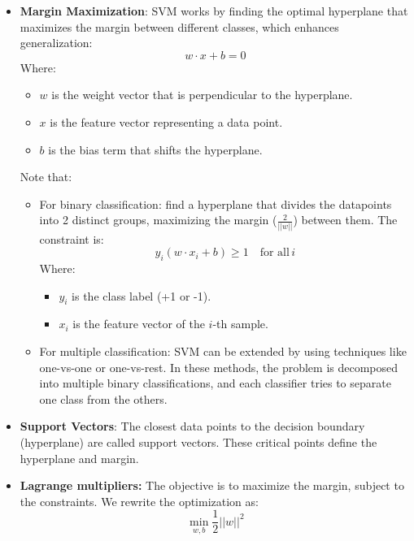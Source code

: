 \begin{itemize}
    \item \textbf{Margin Maximization}: SVM works by finding the optimal hyperplane that maximizes the margin between different classes, which enhances generalization:
    \begin{equation}
        \label{eq:equation8}
        w \cdot x + b = 0
    \end{equation}
    Where:
    \begin{itemize}
        \item $w$ is the weight vector that is perpendicular to the hyperplane.
        \item $x$ is the feature vector representing a data point.
        \item $b$ is the bias term that shifts the hyperplane.
    \end{itemize}

    Note that:
    \begin{itemize}
        \item For binary classification: find a hyperplane that divides the datapoints into 2 distinct groups, maximizing the margin ($\frac{2}{||w||}$) between them.
        The constraint is:
        \begin{equation}
            \label{eq:equation9}
            y_i (w \cdot x_i + b) \geq 1 \quad \text{for all} \, i
        \end{equation}
        Where:
        \begin{itemize}
            \item $y_i$ is the class label (+1 or -1).
            \item $x_i$ is the feature vector of the $i$-th sample.
        \end{itemize}
        \item For multiple classification: SVM can be extended by using techniques like one-vs-one or one-vs-rest.
        In these methods, the problem is decomposed into multiple binary classifications, and each classifier tries to separate one class from the others.
    \end{itemize}

    \item \textbf{Support Vectors}: The closest data points to the decision boundary (hyperplane) are called support vectors.
    These critical points define the hyperplane and margin.

    \item \textbf{Lagrange multipliers:} The objective is to maximize the margin, subject to the constraints.
    We rewrite the optimization as:
    \begin{equation}
        \label{eq:equation11}
        \min_{w, b} \frac{1}{2} ||w||^2
    \end{equation}


\end{itemize}
